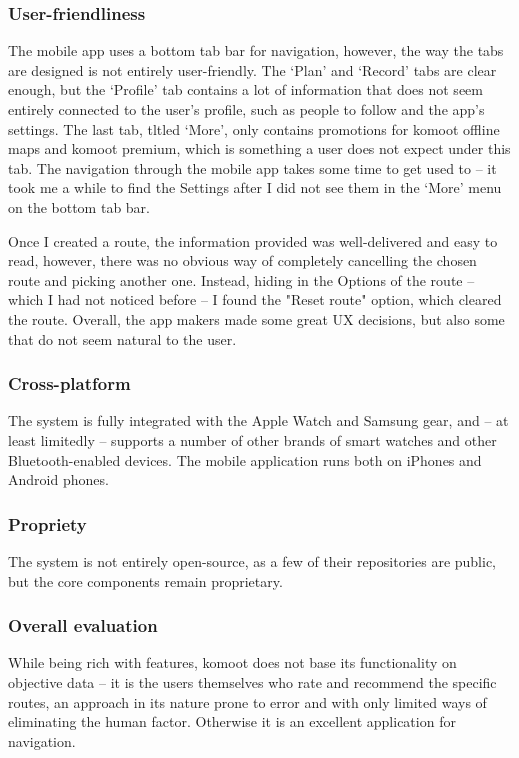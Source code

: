 \subsubsection*{User-friendliness}
The mobile app uses a bottom tab bar for navigation, however, the way the tabs are designed is not entirely user-friendly.
The `Plan' and `Record' tabs are clear enough, but the `Profile' tab contains a lot of information that does not seem entirely connected to the user's profile, such as people to follow and the app's settings.
The last tab, tltled `More', only contains promotions for komoot offline maps and komoot premium, which is something a user does not expect under this tab.
The navigation through the mobile app takes some time to get used to -- it took me a while to find the Settings after I did not see them in the `More' menu on the bottom tab bar.

Once I created a route, the information provided was well-delivered and easy to read, however, there was no obvious way of completely cancelling the chosen route and picking another one.
Instead, hiding in the Options of the route -- which I had not noticed before -- I found the "Reset route" option, which cleared the route.
Overall, the app makers made some great UX decisions, but also some that do not seem natural to the user.
\subsubsection*{Cross-platform}
The system is fully integrated with the Apple Watch and Samsung gear, and -- at least limitedly -- supports a number of other brands of smart watches and other Bluetooth-enabled devices.
The mobile application runs both on iPhones and Android phones.
\subsubsection*{Propriety}
The system is not entirely open-source, as a few of their repositories are public, but the core components remain proprietary. \cite{komoot-github}

\subsubsection*{Overall evaluation}
While being rich with features, komoot does not base its functionality on objective data -- it is the users themselves who rate and recommend the specific routes,
an approach in its nature prone to error and with only limited ways of eliminating the human factor.
Otherwise it is an excellent application for navigation.
